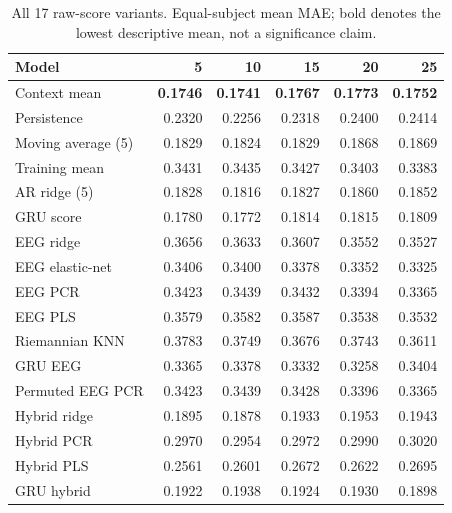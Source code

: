 \begin{table}[!ht]
\centering
\small
\setlength{\tabcolsep}{5pt}
\renewcommand{\arraystretch}{1.1}
\caption{All 17 raw-score variants. Equal-subject mean MAE; bold denotes the lowest descriptive mean, not a significance claim.}
\label{tab:supp_mae_raw}
\begin{tabular}{lrrrrr}
\toprule
Model & 5 & 10 & 15 & 20 & 25 \\
\midrule
Context mean & \textbf{0.1746} & \textbf{0.1741} & \textbf{0.1767} & \textbf{0.1773} & \textbf{0.1752} \\
Persistence & 0.2320 & 0.2256 & 0.2318 & 0.2400 & 0.2414 \\
Moving average (5) & 0.1829 & 0.1824 & 0.1829 & 0.1868 & 0.1869 \\
Training mean & 0.3431 & 0.3435 & 0.3427 & 0.3403 & 0.3383 \\
AR ridge (5) & 0.1828 & 0.1816 & 0.1827 & 0.1860 & 0.1852 \\
GRU score & 0.1780 & 0.1772 & 0.1814 & 0.1815 & 0.1809 \\
\midrule
EEG ridge & 0.3656 & 0.3633 & 0.3607 & 0.3552 & 0.3527 \\
EEG elastic-net & 0.3406 & 0.3400 & 0.3378 & 0.3352 & 0.3325 \\
EEG PCR & 0.3423 & 0.3439 & 0.3432 & 0.3394 & 0.3365 \\
EEG PLS & 0.3579 & 0.3582 & 0.3587 & 0.3538 & 0.3532 \\
Riemannian KNN & 0.3783 & 0.3749 & 0.3676 & 0.3743 & 0.3611 \\
GRU EEG & 0.3365 & 0.3378 & 0.3332 & 0.3258 & 0.3404 \\
Permuted EEG PCR & 0.3423 & 0.3439 & 0.3428 & 0.3396 & 0.3365 \\
\midrule
Hybrid ridge & 0.1895 & 0.1878 & 0.1933 & 0.1953 & 0.1943 \\
Hybrid PCR & 0.2970 & 0.2954 & 0.2972 & 0.2990 & 0.3020 \\
Hybrid PLS & 0.2561 & 0.2601 & 0.2672 & 0.2622 & 0.2695 \\
GRU hybrid & 0.1922 & 0.1938 & 0.1924 & 0.1930 & 0.1898 \\
\bottomrule
\end{tabular}
\end{table}
